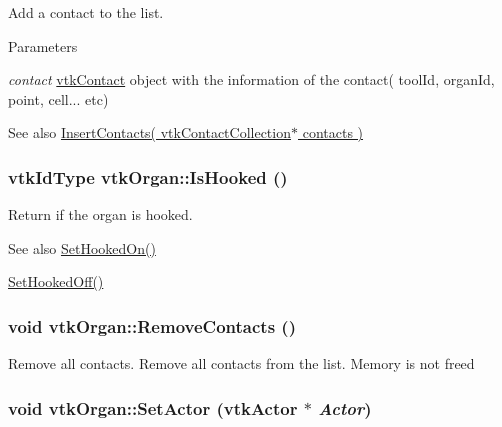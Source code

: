 Add a contact to the list. 
\begin{DoxyParams}{Parameters}
\item[{\em contact}]\hyperlink{classvtkContact}{vtkContact} object with the information of the contact( toolId, organId, point, cell... etc) \end{DoxyParams}
\begin{DoxySeeAlso}{See also}
\hyperlink{classvtkOrgan_aa61c5704ac5458ee9e5bfa6aed6014ce}{InsertContacts( vtkContactCollection$\ast$ contacts )} 
\end{DoxySeeAlso}
\hypertarget{classvtkOrgan_ad61305759deba9189e2a648c9d083fac}{
\subsubsection[{IsHooked}]{\setlength{\rightskip}{0pt plus 5cm}vtkIdType vtkOrgan::IsHooked ()}}
\label{classvtkOrgan_ad61305759deba9189e2a648c9d083fac}


Return if the organ is hooked. \begin{DoxySeeAlso}{See also}
\hyperlink{classvtkOrgan_a78a3cdaeb7e6b23de0880dcb1c407cfe}{SetHookedOn()} 

\hyperlink{classvtkOrgan_ad2ac78a6020fba61ff49edad8a3f6a22}{SetHookedOff()} 
\end{DoxySeeAlso}
\hypertarget{classvtkOrgan_abd019445a21886d765aec818b90add63}{
\subsubsection[{RemoveContacts}]{\setlength{\rightskip}{0pt plus 5cm}void vtkOrgan::RemoveContacts ()}}
\label{classvtkOrgan_abd019445a21886d765aec818b90add63}


Remove all contacts. Remove all contacts from the list. Memory is not freed \hypertarget{classvtkOrgan_a7368fa68add5a80b7b80989df1894233}{
\subsubsection[{SetActor}]{\setlength{\rightskip}{0pt plus 5cm}void vtkOrgan::SetActor (vtkActor $\ast$ {\em Actor})}}
\label{classvtkOrgan_a7368fa68add5a80b7b80989df1894233}


